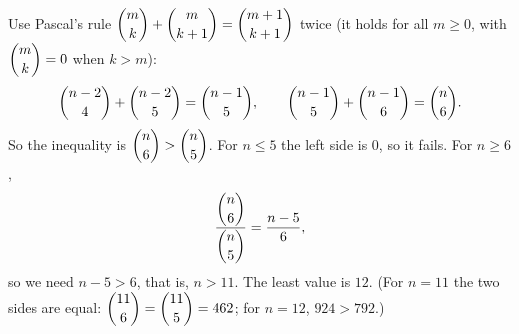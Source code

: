 Use Pascal's rule $\dbinom{m}{k}+\dbinom{m}{k+1}=\dbinom{m+1}{k+1}$ twice (it holds for all $m\ge0$, with $\dbinom mk=0$ when $k>m$):
\[\dbinom{n-2}{4}+\dbinom{n-2}{5}=\dbinom{n-1}{5},\qquad \dbinom{n-1}{5}+\dbinom{n-1}{6}=\dbinom n6 .\]
So the inequality is $\dbinom n6>\dbinom n5$. For $n\le5$ the left side is $0$, so it fails. For $n\ge6$,
\[\dfrac{\dbinom n6}{\dbinom n5}=\dfrac{n-5}{6},\]
so we need $n-5>6$, that is, $n>11$. The least value is $\boxed{12}$. (For $n=11$ the two sides are equal: $\dbinom{11}{6}=\dbinom{11}{5}=462$; for $n=12$, $924>792$.)

